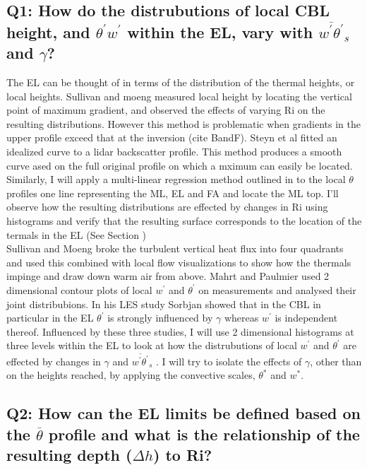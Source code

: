 \subsection{Q1: How do the distrubutions of local \acs{CBL} height, and $\theta^{'}w^{'}$ within the \acs{EL}, vary with $\overline{w^{'}\theta^{'}}_{s}$ and $\gamma$?}     

The \acs{EL} can be thought of in terms of the distribution of the thermal heights, or local heights.  Sullivan and moeng measured local height by locating the vertical point of maximum gradient, and observed the effects of varying \acs{Ri} on the resulting distributions. However this method is problematic when gradients in the upper profile exceed that at the inversion (cite BandF).  Steyn et al fitted an idealized curve to a lidar backscatter profile.  This method produces a smooth curve ased on the full original profile on which a mximum can easily be located.  Similarly, I will apply a multi-linear regression method outlined in \citeauthor{Vieth} to the local $\theta$ profiles one line representing the \acs{ML}, \acs{EL} and \acs{FA} and locate the \acs{ML} top.  I'll observe how the resulting distributions are effected by changes in \acs{Ri} using histograms and verify that the resulting surface corresponds to the location of the termals in the \acs{EL} (See Section %
)
\\
Sullivan and Moeng broke the turbulent vertical heat flux into four quadrants and used this combined with local flow visualizations to show how the thermals impinge and draw down warm air from above.  Mahrt and Paulmier used 2 dimensional contour plots of local $w^{'}$ and $\theta^{'}$ on measurements and analysed their joint distribubions.  In his \acs{LES} study Sorbjan showed that in the \acs{CBL} in particular in the \acs{EL} $\theta^{'}$ is strongly influenced by $\gamma$  whereas $w^{'}$ is independent thereof.  Influenced by these three studies, I will use 2 dimensional histograms at three levels within the \acs{EL} to look at how the distrubutions of local $w^{'}$ and $\theta^{'}$ are effected by changes in $\gamma$ and $\overline{w^{'}\theta^{'}}_{s}$ .  I will try to isolate the effects of $\gamma$, other than on the heights reached, by applying the convective scales, $\theta^{*}$ and $w^{*}$.\\    

\subsection{\textbf{Q2: How can the \acs{EL} limits be defined based on the $\overline{\theta}$ profile and what is the relationship of the resulting depth ($\Delta h$) to \acs{Ri}?}}
       
